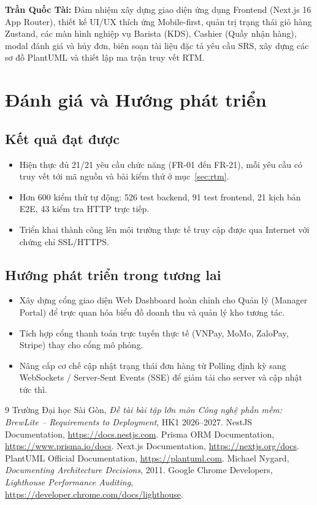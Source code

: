 \documentclass[12pt, a4paper]{article}
\begin{document}
\textbf{Trần Quốc Tài:} Đảm nhiệm xây dựng giao diện ứng dụng Frontend (Next.js 16 App Router), thiết kế UI/UX thích ứng Mobile-first, quản trị trạng thái giỏ hàng Zustand, các màn hình nghiệp vụ Barista (KDS), Cashier (Quầy nhận hàng), modal đánh giá và hủy đơn, biên soạn tài liệu đặc tả yêu cầu SRS, xây dựng các sơ đồ PlantUML và thiết lập ma trận truy vết RTM.

\section{Đánh giá và Hướng phát triển}
\subsection{Kết quả đạt được}
\begin{itemize}
  \item Hiện thực đủ 21/21 yêu cầu chức năng (FR-01 đến FR-21), mỗi yêu cầu có truy vết tới mã nguồn và bài kiểm thử ở mục~\ref{sec:rtm}.
  \item Hơn 600 kiểm thử tự động: 526 test backend, 91 test frontend, 21 kịch bản E2E, 43 kiểm tra HTTP trực tiếp.
  \item Triển khai thành công lên môi trường thực tế truy cập được qua Internet với chứng chỉ SSL/HTTPS.
\end{itemize}

\subsection{Hướng phát triển trong tương lai}
\begin{itemize}
  \item Xây dựng cổng giao diện Web Dashboard hoàn chỉnh cho Quản lý (Manager Portal) để trực quan hóa biểu đồ doanh thu và quản lý kho tương tác.
  \item Tích hợp cổng thanh toán trực tuyến thực tế (VNPay, MoMo, ZaloPay, Stripe) thay cho cổng mô phỏng.
  \item Nâng cấp cơ chế cập nhật trạng thái đơn hàng từ Polling định kỳ sang WebSockets / Server-Sent Events (SSE) để giảm tải cho server và cập nhật tức thì.
\end{itemize}

\begin{thebibliography}{9}
 Trường Đại học Sài Gòn, \emph{Đề tài bài tập lớn môn Công nghệ phần mềm: BrewLite -- Requirements to Deployment}, HK1 2026--2027.
 NestJS Documentation, \url{https://docs.nestjs.com}.
 Prisma ORM Documentation, \url{https://www.prisma.io/docs}.
 Next.js Documentation, \url{https://nextjs.org/docs}.
 PlantUML Official Documentation, \url{https://plantuml.com}.
 Michael Nygard, \emph{Documenting Architecture Decisions}, 2011.
 Google Chrome Developers, \emph{Lighthouse Performance Auditing}, \url{https://developer.chrome.com/docs/lighthouse}.
\end{thebibliography}
\end{document}
